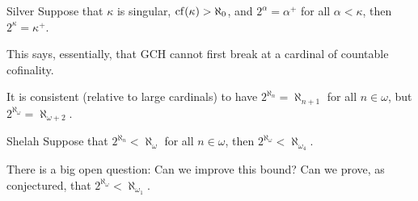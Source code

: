 \documentclass{article}
\begin{document}
\begin{fancythm}{Silver}
    Suppose that $\kappa$ is singular, $\operatorname{cf}(\kappa)>\aleph_{0}$, and $2^{\alpha}=\alpha^{+}$ for all $\alpha< \kappa$, then $2^{\kappa} = \kappa^{+}$.
\end{fancythm}
This says, essentially, that GCH cannot first break at a cardinal of countable cofinality.
\begin{remark*}{}
    It is consistent (relative to large cardinals) to have $2^{\aleph_{n}}=\aleph_{n+1}$ for all $n \in \omega$, but $2^{\aleph_{\omega}}=\aleph_{\omega+2}$.
\end{remark*}
\begin{fancythm}{Shelah}
    Suppose that $2^{\aleph_{n}}<\aleph_{\omega}$ for all $n \in \omega$, then $ 2^{\aleph_{\omega}}< \aleph_{\omega_{4}}.$
\end{fancythm}
There is a big open question: Can we improve this bound? Can we prove, as conjectured, that $2^{\aleph_{\omega}}<\aleph_{\omega_{1}}$.
\newlec
\end{document}
